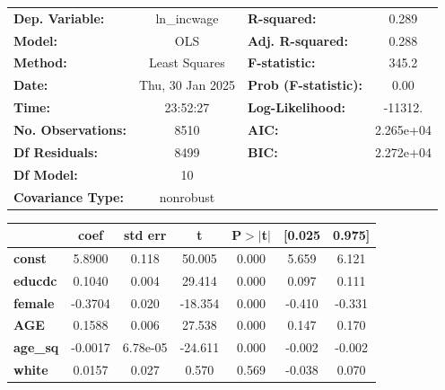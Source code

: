 \documentclass[
  letterpaper,
  DIV=11,
  numbers=noendperiod]{scrartcl}
\begin{document}
\begin{center}
\begin{tabular}{lclc}
\toprule
\textbf{Dep. Variable:}    &   ln\_incwage    & \textbf{  R-squared:         } &     0.289   \\
\textbf{Model:}            &       OLS        & \textbf{  Adj. R-squared:    } &     0.288   \\
\textbf{Method:}           &  Least Squares   & \textbf{  F-statistic:       } &     345.2   \\
\textbf{Date:}             & Thu, 30 Jan 2025 & \textbf{  Prob (F-statistic):} &     0.00    \\
\textbf{Time:}             &     23:52:27     & \textbf{  Log-Likelihood:    } &   -11312.   \\
\textbf{No. Observations:} &        8510      & \textbf{  AIC:               } & 2.265e+04   \\
\textbf{Df Residuals:}     &        8499      & \textbf{  BIC:               } & 2.272e+04   \\
\textbf{Df Model:}         &          10      & \textbf{                     } &             \\
\textbf{Covariance Type:}  &    nonrobust     & \textbf{                     } &             \\
\bottomrule
\end{tabular}
\begin{tabular}{lcccccc}
                  & \textbf{coef} & \textbf{std err} & \textbf{t} & \textbf{P$> |$t$|$} & \textbf{[0.025} & \textbf{0.975]}  \\
\midrule
\textbf{const}    &       5.8900  &        0.118     &    50.005  &         0.000        &        5.659    &        6.121     \\
\textbf{educdc}   &       0.1040  &        0.004     &    29.414  &         0.000        &        0.097    &        0.111     \\
\textbf{female}   &      -0.3704  &        0.020     &   -18.354  &         0.000        &       -0.410    &       -0.331     \\
\textbf{AGE}      &       0.1588  &        0.006     &    27.538  &         0.000        &        0.147    &        0.170     \\
\textbf{age\_sq}  &      -0.0017  &     6.78e-05     &   -24.611  &         0.000        &       -0.002    &       -0.002     \\
\textbf{white}    &       0.0157  &        0.027     &     0.570  &         0.569        &       -0.038    &        0.070     \\

\end{tabular}
\end{center}
\end{document}
